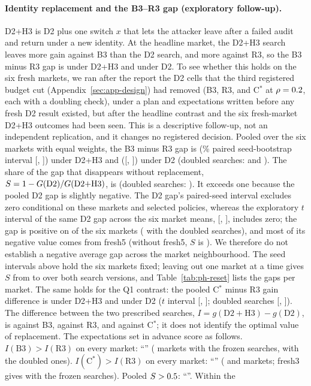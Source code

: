 \documentclass[11pt]{article}
\begin{document}
\paragraph{Identity replacement and the B3--R3 gap (exploratory follow-up).} D2+H3 is D2 plus one switch $x$ that lets the attacker leave after a failed audit and return under a new identity. At the headline market, the D2+H3 search leaves  more gain against B3 than the D2 search, and  more against R3, so the B3 minus R3 gap is  under D2+H3 and  under D2. To see whether this holds on the six fresh markets, we ran after the report the D2 cells that the third registered budget cut (Appendix~\ref{sec:app-design}) had removed (B3, R3, and C$^*$ at $\rho=0.2$, each with a doubling check), under a plan and expectations written before any fresh D2 result existed, but after the headline contrast and the six fresh-market D2+H3 outcomes had been seen. This is a descriptive follow-up, not an independent replication, and it changes no registered decision. Pooled over the six markets with equal weights, the B3 minus R3 gap is  (\% paired seed-bootstrap interval [, ]) under D2+H3 and  ([, ]) under D2 (doubled searches:  and ). The share of the gap that disappears without replacement, $S = 1 - G(\mathrm{D2})/G(\mathrm{D2{+}H3})$, is  (doubled searches: ). It exceeds one because the pooled D2 gap is slightly negative. The D2 gap's paired-seed interval excludes zero conditional on these markets and selected policies, whereas the exploratory $t$ interval of the same D2 gap across the six market means, [, ], includes zero; the gap is positive on  of the six markets ( with the doubled searches), and most of its negative value comes from fresh5 (without fresh5, $S$ is ). We therefore do not establish a negative average gap across the market neighbourhood. The seed intervals above hold the six markets fixed; leaving out one market at a time gives $S$ from  to  over both search versions, and Table~\ref{tab:ph-reset} lists the gaps per market. The same holds for the Q1 contrast: the pooled C$^*$ minus R3 gain difference is  under D2+H3 and  under D2 ($t$ interval [, ]; doubled searches [, ]). The difference between the two prescribed searches, $I = g(\mathrm{D2{+}H3}) - g(\mathrm{D2})$, is  against B3,  against R3, and  against C$^*$; it does not identify the optimal value of replacement. The expectations set in advance score as follows. $I(\mathrm{B3}) > I(\mathrm{R3})$ on every market: ``'' ( markets with the frozen searches,  with the doubled ones). $I(\mathrm{C}^*) > I(\mathrm{R3})$ on every market: ``'' ( and  markets; fresh3 gives  with the frozen searches). Pooled $S > 0.5$: ``''. Within the 
\end{document}

